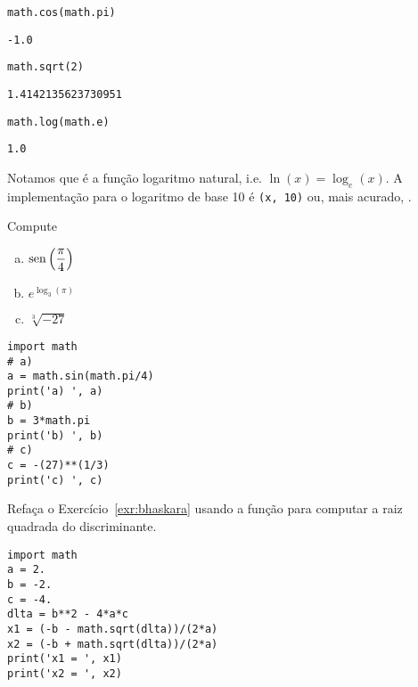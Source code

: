 \begin{lstlisting}
math.cos(math.pi)
\end{lstlisting}

\begin{verbatim}
-1.0
\end{verbatim}

\begin{lstlisting}
math.sqrt(2)
\end{lstlisting}

\begin{verbatim}
1.4142135623730951
\end{verbatim}

\begin{lstlisting}
math.log(math.e)
\end{lstlisting}

\begin{verbatim}
1.0
\end{verbatim}


\begin{obs}
  Notamos que {\PYTHONmathDOTlog} é a função logaritmo natural, i.e. $\ln(x) = \log_e(x)$. A implementação {\python} para o logaritmo de base 10 é {\PYTHONmathDOTlog}\texttt{(x, 10)} ou, mais acurado, {\PYTHONmathDOTlogTen}.
\end{obs}

\begin{exer}
  Compute
  \begin{enumerate}[a)]
  \item $\displaystyle \operatorname{sen}\left(\frac{\pi}{4}\right)$
  \item $\displaystyle e^{\log_3(\pi)}$
  \item $\displaystyle \sqrt[3]{-27}$
  \end{enumerate}
\end{exer}
\begin{resp}

\begin{lstlisting}
import math
# a)
a = math.sin(math.pi/4)
print('a) ', a)
# b)
b = 3*math.pi
print('b) ', b)
# c)
c = -(27)**(1/3)
print('c) ', c)
\end{lstlisting}

\end{resp}

\begin{exer}
  Refaça o Exercício~\ref{exr:bhaskara} usando a função {\PYTHONmathDOTsqrt} para computar a raiz quadrada do discriminante.
\end{exer}
\begin{resp}
  
\begin{lstlisting}
import math
a = 2.
b = -2.
c = -4.
dlta = b**2 - 4*a*c
x1 = (-b - math.sqrt(dlta))/(2*a)
x2 = (-b + math.sqrt(dlta))/(2*a)
print('x1 = ', x1)
print('x2 = ', x2)  
\end{lstlisting}

\end{resp}

